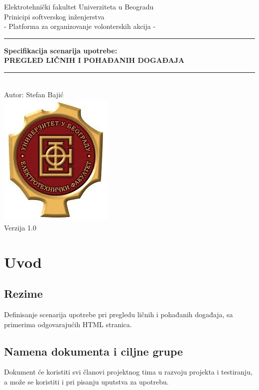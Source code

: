 \documentclass[11pt,a4paper]{article}
\begin{document}
\begin{titlepage}

\centering
\textnormal{\large Elektrotehnički fakultet Univerziteta u Beogradu}\\[0.1cm]
\textnormal{\large Prinicipi softverskog inženjerstva}\\[3cm]

\textnormal{\normalsize - Platforma za organizovanje volonterskih akcija -}\\\vspace{-5mm}
\rule{\textwidth}{0.4pt}
{\huge \bfseries Specifikacija scenarija upotrebe:\\ 
PREGLED LIČNIH I POHAĐANIH DOGAĐAJA\par}\vspace{-1mm}
\rule{\textwidth}{0.4pt}\\\vspace{1mm}
\textnormal{\large Autor: Stefan Bajić}\\[6cm]

\includegraphics[scale=0.5]{logo.jpg}\\
\vfill
\textnormal{\normalsize Verzija 1.0}\\

\end{titlepage}

\tableofcontents

\newpage

\section{Uvod}
\subsection{Rezime}
Definisanje scenarija upotrebe pri pregledu ličnih i pohađanih događaja, sa primerima odgovarajućih HTML stranica.
\subsection{Namena dokumenta i ciljne grupe}
Dokument će koristiti svi članovi projektnog tima u razvoju projekta i testiranju, a može se koristiti i pri pisanju uputstva za upotrebu.
\end{document}
